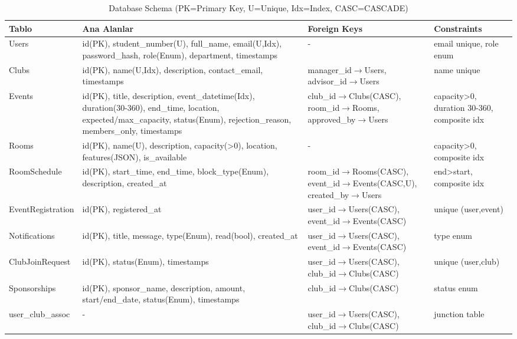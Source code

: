 \documentclass[a4paper,12pt]{report}
\begin{document}
\begin{table}[h]
\centering
\tiny
\begin{tabular}{|l|p{6cm}|p{4.5cm}|p{2cm}|}
\hline
\textbf{Tablo} & \textbf{Ana Alanlar} & \textbf{Foreign Keys} & \textbf{Constraints} \\ \hline
Users & id(PK), student\_number(U), full\_name, email(U,Idx), password\_hash, role(Enum), department, timestamps & - & email unique, role enum \\ \hline
Clubs & id(PK), name(U,Idx), description, contact\_email, timestamps & manager\_id$\rightarrow$Users, advisor\_id$\rightarrow$Users & name unique \\ \hline
Events & id(PK), title, description, event\_datetime(Idx), duration(30-360), end\_time, location, expected/max\_capacity, status(Enum), rejection\_reason, members\_only, timestamps & club\_id$\rightarrow$Clubs(CASC), room\_id$\rightarrow$Rooms, approved\_by$\rightarrow$Users & capacity>0, duration 30-360, composite idx \\ \hline
Rooms & id(PK), name(U), description, capacity(>0), location, features(JSON), is\_available & - & capacity>0, composite idx \\ \hline
RoomSchedule & id(PK), start\_time, end\_time, block\_type(Enum), description, created\_at & room\_id$\rightarrow$Rooms(CASC), event\_id$\rightarrow$Events(CASC,U), created\_by$\rightarrow$Users & end>start, composite idx \\ \hline
EventRegistration & id(PK), registered\_at & user\_id$\rightarrow$Users(CASC), event\_id$\rightarrow$Events(CASC) & unique (user,event) \\ \hline
Notifications & id(PK), title, message, type(Enum), read(bool), created\_at & user\_id$\rightarrow$Users(CASC), event\_id$\rightarrow$Events(CASC) & type enum \\ \hline
ClubJoinRequest & id(PK), status(Enum), timestamps & user\_id$\rightarrow$Users(CASC), club\_id$\rightarrow$Clubs(CASC) & unique (user,club) \\ \hline
Sponsorships & id(PK), sponsor\_name, description, amount, start/end\_date, status(Enum), timestamps & club\_id$\rightarrow$Clubs(CASC) & status enum \\ \hline
user\_club\_assoc & - & user\_id$\rightarrow$Users(CASC), club\_id$\rightarrow$Clubs(CASC) & junction table \\ \hline
\end{tabular}
\caption{Database Schema (PK=Primary Key, U=Unique, Idx=Index, CASC=CASCADE)}
\end{table}
\end{document}
